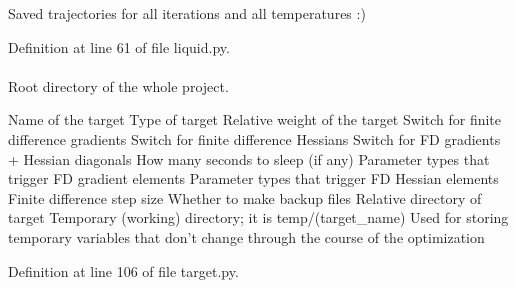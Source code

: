 \-Saved trajectories for all iterations and all temperatures \-:) 



\-Definition at line 61 of file liquid.\-py.

\hypertarget{classforcebalance_1_1target_1_1Target_aede2856573b890cd47054ad36937d6f6}{
\paragraph[{tempdir}]{}}\label{classforcebalance_1_1target_1_1Target_aede2856573b890cd47054ad36937d6f6}


\-Root directory of the whole project. 

\-Name of the target \-Type of target \-Relative weight of the target \-Switch for finite difference gradients \-Switch for finite difference \-Hessians \-Switch for \-F\-D gradients + \-Hessian diagonals \-How many seconds to sleep (if any) \-Parameter types that trigger \-F\-D gradient elements \-Parameter types that trigger \-F\-D \-Hessian elements \-Finite difference step size \-Whether to make backup files \-Relative directory of target \-Temporary (working) directory; it is temp/(target\-\_\-name) \-Used for storing temporary variables that don't change through the course of the optimization 

\-Definition at line 106 of file target.\-py.

\hypertarget{classforcebalance_1_1BaseClass_afd68efa29ccd2f320f4cf82198214aac}{
\paragraph[{verbose\-\_\-options}]{}}\label{classforcebalance_1_1BaseClass_afd68efa29ccd2f320f4cf82198214aac}


